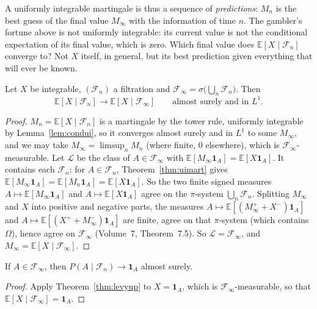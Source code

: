 A uniformly integrable martingale is thus a sequence of \emph{predictions}: $M_n$ is the best guess of the final value $M_\infty$ with the information of time $n$. The gambler's
fortune above is not uniformly integrable: its current value is not the conditional expectation of its final value, which is zero. Which final value does $\mathbb E[X\mid\mathcal F_n]$ converge to? Not $X$ itself, in general, but its best
prediction given everything that will ever be known.

\begin{theorem}\label{thm:levyup}
Let $X$ be integrable, $(\mathcal F_n)$ a filtration and $\mathcal F_\infty=\sigma\bigl(\bigcup_n\mathcal F_n\bigr)$. Then
\[
\mathbb E[X\mid\mathcal F_n]\longrightarrow\mathbb E[X\mid\mathcal F_\infty]\qquad\text{almost surely and in }L^1.
\]
\end{theorem}
\begin{proof}
$M_n=\mathbb E[X\mid\mathcal F_n]$ is a martingale by the tower rule, uniformly integrable by Lemma~\ref{lem:condui}, so it converges almost surely and in $L^1$ to some $M_\infty$, and we may take
$M_\infty=\limsup_nM_n$ (where finite, $0$ elsewhere), which is $\mathcal F_\infty$-measurable. Let $\mathcal L$ be the class of $A\in\mathcal F_\infty$ with $\mathbb E[M_\infty\mathbf 1_A]=\mathbb E[X\mathbf 1_A]$. It contains each
$\mathcal F_n$: for $A\in\mathcal F_n$, Theorem~\ref{thm:uimart} gives $\mathbb E[M_\infty\mathbf 1_A]=\mathbb E[M_n\mathbf 1_A]=\mathbb E[X\mathbf 1_A]$. So the two finite signed measures
$A\mapsto\mathbb E[M_\infty\mathbf 1_A]$ and $A\mapsto\mathbb E[X\mathbf 1_A]$ agree on the $\pi$-system $\bigcup_n\mathcal F_n$. Splitting $M_\infty$ and $X$ into positive and negative parts, the measures
$A\mapsto\mathbb E[(M_\infty^++X^-)\mathbf 1_A]$ and $A\mapsto\mathbb E[(X^++M_\infty^-)\mathbf 1_A]$ are finite, agree on that $\pi$-system (which contains $\Omega$), hence agree on $\mathcal F_\infty$ (Volume~7, Theorem~7.5).
So $\mathcal L=\mathcal F_\infty$, and $M_\infty=\mathbb E[X\mid\mathcal F_\infty]$.
\end{proof}

\begin{corollary}\label{cor:levy01}
If $A\in\mathcal F_\infty$, then $P(A\mid\mathcal F_n)\to\mathbf 1_A$ almost surely.
\end{corollary}
\begin{proof}
Apply Theorem~\ref{thm:levyup} to $X=\mathbf 1_A$, which is $\mathcal F_\infty$-measurable, so that $\mathbb E[X\mid\mathcal F_\infty]=\mathbf 1_A$.
\end{proof}

